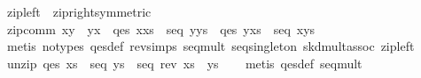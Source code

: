 \begin{isabellebody}
%
\endisadelimproof
\isanewline
{}\isamarkupfalse%
\ zip{}left\ {}\ zip{}right{}symmetric{}\isanewline
\isanewline
{}\isamarkupfalse%
\ zip{}comm{}\ {}x{}y\ {}\ y{}x\ {}\ qes\ {}x{}xs{}\ {}\ seq\ {}y{}ys{}\ {}\ qes\ {}y{}xs{}\ {}\ seq\ {}x{}ys{}{}\isanewline
%
\isadelimproof
\ \ %
\endisadelimproof
%
\isatagproof
{}\isamarkupfalse%
\ {}metis\ {}no{}types{}\ qes{}def\ rev{}simps{}{}{}\ seq{}mult\ seq{}singleton\ skd{}mult{}assoc\ zip{}left{}%
\endisatagproof
{\isafoldproof}%
%
\isadelimproof
\isanewline
%
\endisadelimproof
\isanewline
{}\isamarkupfalse%
\ unzip{}\ {}qes\ xs\ {}\ seq\ ys\ {}\ seq\ {}rev\ xs\ {}\ ys{}{}\isanewline
%
\isadelimproof
\ \ %
\endisadelimproof
%
\isatagproof
{}\isamarkupfalse%
\ {}metis\ qes{}def\ seq{}mult{}%

\end{isabellebody}
